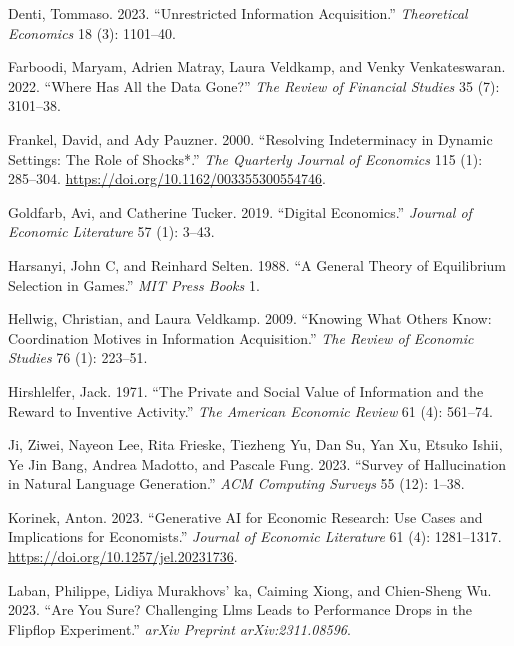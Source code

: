 \documentclass[
]{article}
\newlength{\cslhangindent}
\newenvironment{CSLReferences}[2] %
 {\begin{list}{}{%
  \setlength{\itemindent}{0pt}
  \setlength{\leftmargin}{0pt}
  \setlength{\parsep}{0pt}
  \ifodd #1
   \setlength{\leftmargin}{\cslhangindent}
   \setlength{\itemindent}{-1\cslhangindent}
  \fi
  \setlength{\itemsep}{#2\baselineskip}}}
 {\end{list}}
\theoremstyle{plain}
\theoremstyle{definition}
\theoremstyle{remark}
\begin{document}
\begin{CSLReferences}{1}{0}
Denti, Tommaso. 2023. {``Unrestricted Information Acquisition.''}
\emph{Theoretical Economics} 18 (3): 1101--40.

Farboodi, Maryam, Adrien Matray, Laura Veldkamp, and Venky
Venkateswaran. 2022. {``Where Has All the Data Gone?''} \emph{The Review
of Financial Studies} 35 (7): 3101--38.

Frankel, David, and Ady Pauzner. 2000. {``{Resolving Indeterminacy in
Dynamic Settings: The Role of Shocks*}.''} \emph{The Quarterly Journal
of Economics} 115 (1): 285--304.
\url{https://doi.org/10.1162/003355300554746}.

Goldfarb, Avi, and Catherine Tucker. 2019. {``Digital Economics.''}
\emph{Journal of Economic Literature} 57 (1): 3--43.

Harsanyi, John C, and Reinhard Selten. 1988. {``A General Theory of
Equilibrium Selection in Games.''} \emph{MIT Press Books} 1.

Hellwig, Christian, and Laura Veldkamp. 2009. {``Knowing What Others
Know: Coordination Motives in Information Acquisition.''} \emph{The
Review of Economic Studies} 76 (1): 223--51.

Hirshlelfer, Jack. 1971. {``The Private and Social Value of Information
and the Reward to Inventive Activity.''} \emph{The American Economic
Review} 61 (4): 561--74.

Ji, Ziwei, Nayeon Lee, Rita Frieske, Tiezheng Yu, Dan Su, Yan Xu, Etsuko
Ishii, Ye Jin Bang, Andrea Madotto, and Pascale Fung. 2023. {``Survey of
Hallucination in Natural Language Generation.''} \emph{ACM Computing
Surveys} 55 (12): 1--38.

Korinek, Anton. 2023. {``Generative AI for Economic Research: Use Cases
and Implications for Economists.''} \emph{Journal of Economic
Literature} 61 (4): 1281--1317.
\url{https://doi.org/10.1257/jel.20231736}.

Laban, Philippe, Lidiya Murakhovs' ka, Caiming Xiong, and Chien-Sheng
Wu. 2023. {``Are You Sure? Challenging Llms Leads to Performance Drops
in the Flipflop Experiment.''} \emph{arXiv Preprint arXiv:2311.08596}.


\end{CSLReferences}
\end{document}
